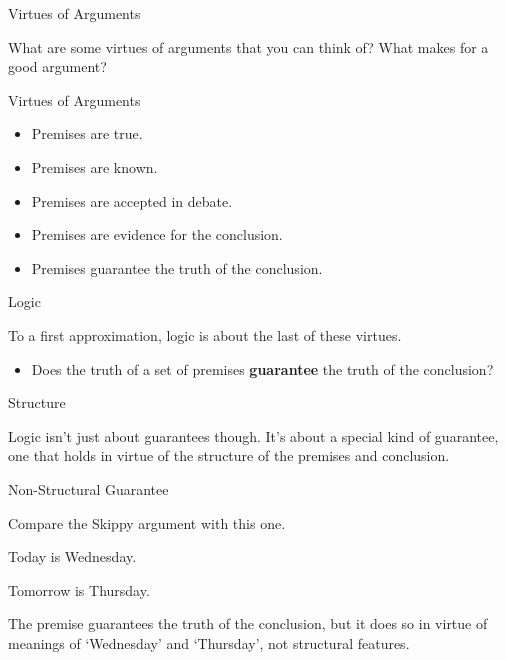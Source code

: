 \documentclass[
  ignorenonframetext,
]{beamer}
\providecommand{\tightlist}{%
  \setlength{\itemsep}{0pt}\setlength{\parskip}{0pt}}
\renewcommand{\,}{\text{, }}
\renewenvironment*{quote}	
	{\list{}{\rightmargin   \leftmargin} \item } 	
	{\endlist }
\newcommand{\DisplayArg}[2]{
\begin{enumerate}
{#1}
\end{enumerate}
\vspace{-6pt}
\hrulefill

\begin{quote}
{\normalfont #2}
\end{quote}
\vspace{12pt}
}
\begin{document}
\begin{frame}{Virtues of Arguments}
\protect\hypertarget{virtues-of-arguments}{}

What are some virtues of arguments that you can think of? What makes for
a good argument?

\end{frame}

\begin{frame}{Virtues of Arguments}
\protect\hypertarget{virtues-of-arguments-1}{}

\begin{itemize}[<+->]
\tightlist
\item
  Premises are true.
\item
  Premises are known.
\item
  Premises are accepted in debate.
\item
  Premises are evidence for the conclusion.
\item
  Premises guarantee the truth of the conclusion.
\end{itemize}

\end{frame}

\begin{frame}{Logic}
\protect\hypertarget{logic}{}

To a first approximation, logic is about the last of these virtues.

\begin{itemize}
\tightlist
\item
  Does the truth of a set of premises \textbf{guarantee} the truth of
  the conclusion?
\end{itemize}

\end{frame}

\begin{frame}{Structure}
\protect\hypertarget{structure}{}

Logic isn't just about guarantees though. It's about a special kind of
guarantee, one that holds in virtue of the structure of the premises and
conclusion.

\end{frame}

\begin{frame}{Non-Structural Guarantee}
\protect\hypertarget{non-structural-guarantee}{}

Compare the Skippy argument with this one.

\DisplayArg{ \item Today is Wednesday. } { Tomorrow is Thursday. }

The premise guarantees the truth of the conclusion, but it does so in
virtue of meanings of `Wednesday' and `Thursday', not structural
features.

\end{frame}
\end{document}
